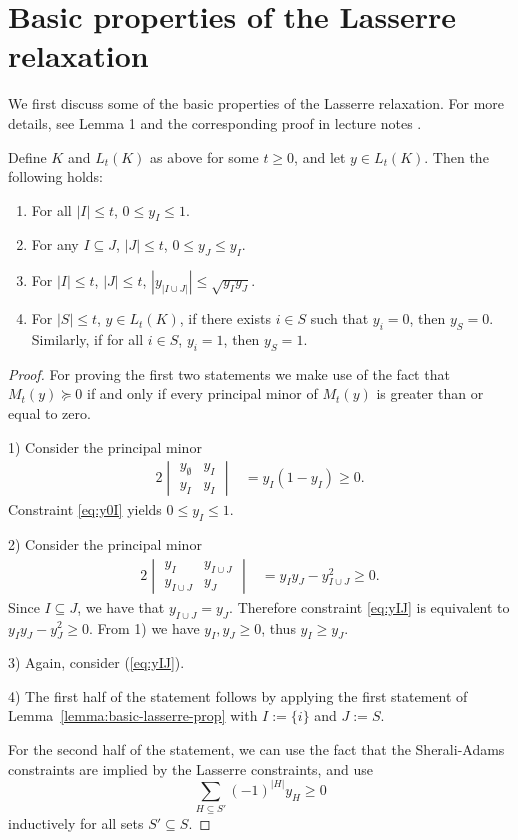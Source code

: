 \documentclass[a4paper,twoside,justified]{tufte-handout}
\begin{document}
\section{Basic properties of the Lasserre relaxation}
We first discuss some of the basic properties of the Lasserre relaxation. For more details, see Lemma 1 and the corresponding proof in lecture notes \cite{lasserresurvey2013}.
\begin{lemma}\label{lemma:basic-lasserre-prop}
  Define $K$ and $L_t(K)$ as above for some $t \ge 0$, and let $y \in L_t(K)$.
  Then the following holds:
  \begin{enumerate}
    \item For all $|I| \le t$, $0 \le y_I \le 1$.
    \item For any $I \subseteq J$, $|J| \le t$, $0 \le y_J \le y_I$.
    \item For $|I| \le t$, $|J| \le t$, $|y_{|I \cup J|}| \le \sqrt{y_I y_J}$.
    \item For $|S| \le t$, $y \in L_t(K)$, 
      if there exists $i \in S$ such that $y_i=0$, then $y_S=0$.
      Similarly, if for all $i \in S$, $y_i=1$, then $y_S=1$.
  \end{enumerate}
\end{lemma}
\begin{proof}
For proving the first two statements we make use of the fact that $M_t(y)  \succeq 0$ if and only if every principal minor of $M_t(y)$ is greater than or equal to zero. 

1) Consider the principal minor 
  \begin{alignat}{2}
    \begin{vmatrix}
      y_{\emptyset} & y_{I} \\
      y_{I} & y_I 
    \end{vmatrix}
 &= y_I(1-y_I)\geq 0. \label{eq:y0I}
  \end{alignat}
Constraint \eqref{eq:y0I} yields $0 \le y_I \le 1$. 

2) Consider the principal minor
  \begin{alignat}{2}
    \begin{vmatrix}
      y_I & y_{I \cup J} \\
      y_{I \cup J} & y_J 
    \end{vmatrix}
 &= y_Iy_J-y_{I\cup J}^2\geq 0. \label{eq:yIJ}
  \end{alignat}
  Since $I \subseteq J$, we have that $y_{I \cup J} = y_{J}$.
  Therefore constraint \eqref{eq:yIJ} is equivalent to $y_I y_J - y_J^2 \ge 0$.
  From 1) we have $y_I, y_J \ge 0$, thus $y_I \ge y_J$.
  
  3) Again, consider (\ref{eq:yIJ}). 

  4) The first half of the statement follows by applying the first statement
  of Lemma~\ref{lemma:basic-lasserre-prop} with $I:=\{i\}$ and $J:=S$.

  For the second half of the statement, we can use the fact that the Sherali-Adams
  constraints are implied by the Lasserre constraints, and use
  \[
  \sum_{H \subseteq S'} (-1)^{|H|} y_H \ge 0
  \]
  inductively for all sets $S' \subseteq S$.
\end{proof}
\end{document}
